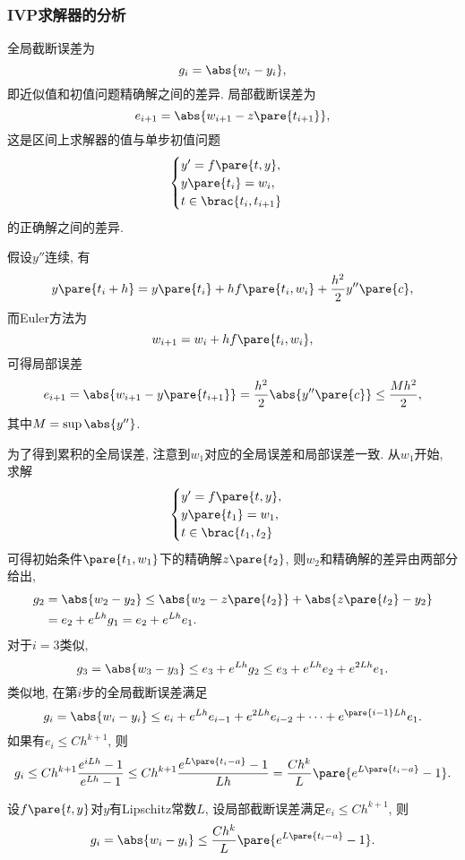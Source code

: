 \documentclass{ctexart}
\begin{document}

\subsubsection{IVP求解器的分析} %
\label{ssub:ivp求解器的分析}

全局截断误差为
\[ g_i = \abs{w_i - y_i}, \]
即近似值和初值问题精确解之间的差异. 局部截断误差为
\[ e_{i+1} = \abs{w_{i+1} - z\pare{t_{i+1}}}, \]
这是区间上求解器的值与单步初值问题
\[ \begin{cases}
    y' = f\pare{t,y}, \\
    y\pare{t_i} = w_i, \\
    t\in \brac{t_i,t_{i+1}}
\end{cases} \]
的正确解之间的差异.
\begin{ex}
    假设$y''$连续, 有
    \[ y\pare{t_i + h} = y\pare{t_i} + hf\pare{t_i,w_i} + \frac{h^2}{2}y''\pare{c}, \]
    而Euler方法为
    \[ w_{i+1} = w_i + hf\pare{t_i,w_i}, \]
    可得局部误差
    \[ e_{i+1} = \abs{w_{i+1} - y\pare{t_{i+1}}} = \frac{h^2}{2}\abs{y''\pare{c}} \le \frac{Mh^2}{2}, \]
    其中$M = \sup \abs{y''}$.
\end{ex}
为了得到累积的全局误差, 注意到$w_1$对应的全局误差和局部误差一致. 从$w_1$开始, 求解
\[ \begin{cases}
    y' = f\pare{t,y}, \\
    y\pare{t_1} = w_1,\\
    t\in\brac{t_1,t_2}
\end{cases} \]
可得初始条件$\pare{t_1,w_1}$下的精确解$z\pare{t_2}$, 则$w_2$和精确解的差异由两部分给出,
\begin{align*}
    g_2 &= \abs{w_2 - y_2} \le \abs{w_2 - z\pare{t_2}} + \abs{z\pare{t_2} - y_2} \\
    &= e_2 + e^{Lh} g_1 = e_2 + e^{Lh} e_1.
\end{align*}
对于$i=3$类似,
\[ g_3 = \abs{w_3 - y_3} \le e_3 + e^{Lh}g_2 \le e_3 + e^{Lh}e_2 + e^{2Lh}e_1. \]
类似地, 在第$i$步的全局截断误差满足
\[ g_i = \abs{w_i - y_i} \le e_i + e^{Lh}e_{i-1} + e^{2Lh}e_{i-2} + \cdots + e^{\pare{i-1}Lh}e_1. \]
如果有$e_i \le Ch^{k+1}$, 则
\[ g_i \le Ch^{k+1}\frac{e^{iLh} - 1}{e^{Lh}-1} \le Ch^{k+1}\frac{e^{L\pare{t_i - a}} - 1}{Lh} = \frac{Ch^k}{L}\pare{e^{L\pare{t_i-a}} - 1}. \]
\begin{theorem}
    设$f\pare{t,y}$对$y$有Lipschitz常数$L$, 设局部截断误差满足$e_i \le C h^{k+1}$, 则
    \[ g_i = \abs{w_i - y_i} \le \frac{Ch^k}{L}\pare{e^{L\pare{t_i - a}} - 1}. \]
\end{theorem}
\end{document}
